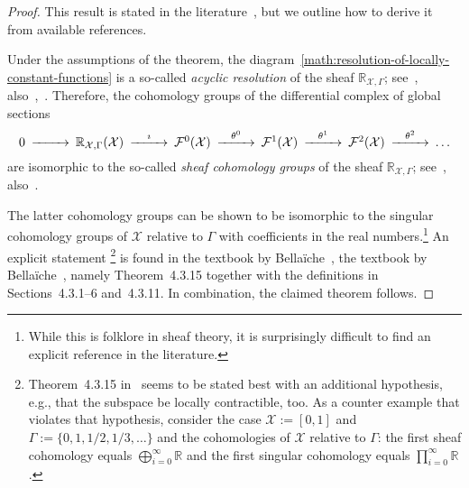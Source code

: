 \documentclass[10pt,a4paper]{amsart}
\theoremstyle{definition}
\theoremstyle{remark}
\numberwithin{equation}{section}
\newcommand{\bbR}{{\mathbb R}}
\newcommand{\calF}{{\mathcal F}}
\newcommand{\calX}{{\mathcal X}}
\begin{document}
\begin{proof}
    This result is stated in the literature~\cite[Theorem~5.1]{goldshtein2011hodge},
    but we outline how to derive it from available references. 

    Under the assumptions of the theorem, the diagram~\eqref{math:resolution-of-locally-constant-functions} is a so-called \emph{acyclic resolution} of the sheaf $\bbR_{\calX,\Gamma}$;
    see~\cite[Lemma~II.3.3]{bartocci1991geometry}, also~\cite[Satz 4.5.12]{deitmar2025kohomologie},~\cite[Satz 2.17, Satz 3.2]{cap1998garben}.
Therefore, the cohomology groups of the differential complex of global sections 
    \begin{align}\label{math:complex-of-global-sections}
        \begin{CD}
            0
            @>>>
            \bbR_{\calX,\Gamma}(\calX)
            @>{\imath}>>
            \calF^{0}(\calX)
            @>{\theta^{0}}>>
            \calF^{1}(\calX)
            @>{\theta^{1}}>>
            \calF^{2}(\calX)
            @>{\theta^{2}}>>
            \dots 
        \end{CD}
    \end{align}
    are isomorphic to the so-called \emph{sheaf cohomology groups} of the sheaf $\bbR_{\calX,\Gamma}$;
    see~\cite[Proposition~II.2.4]{bartocci1991geometry}, also~\cite[Satz 3.5]{cap1998garben}.
    
    The latter cohomology groups can be shown to be isomorphic to the singular cohomology groups of $\calX$ relative to $\Gamma$ with coefficients in the real numbers.\footnote{While this is folklore in sheaf theory, it is surprisingly difficult to find an explicit reference in the literature.}
    An explicit statement
    \footnote{Theorem~4.3.15 in~\cite{theeigenbook} seems to be stated best with an additional hypothesis, e.g., that the subspace be locally contractible, too. As a counter example that violates that hypothesis, consider the case $\calX := [0,1]$ and $\Gamma := \{0,1,1/2,1/3,\dots\}$ and the cohomologies of $\calX$ relative to $\Gamma$: the first sheaf cohomology equals $\bigoplus_{i=0}^\infty \bbR$ and the first singular cohomology equals $\prod_{i=0}^\infty \bbR$.}
    is found in the textbook by Bellaïche~\cite{theeigenbook},
    the textbook by Bellaïche~\cite{theeigenbook},
    namely Theorem~4.3.15 together with the definitions in Sections~4.3.1--6 and~4.3.11. 
    In combination, the claimed theorem follows.
\end{proof}
\end{document}
